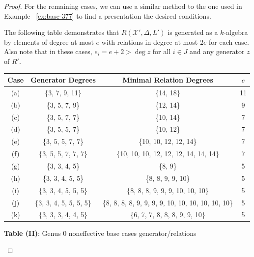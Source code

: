 \documentclass{amsart}
\theoremstyle{plain}
\theoremstyle{definition}
\theoremstyle{remark}
\numberwithin{equation}{section}
\newcommand \sx{\mathscr X}
\begin{document}
\begin{proof}
For the remaining cases, we can use a similar method to the one
used in Example ~\ref{ex:base-377} to find a presentation the
desired conditions.

The following table demonstrates that $R(\sx', \Delta, L')$ is
generated as a $k$-algebra by elements of degree at most $e$
with relations in degree at most $2e$ for each case. Also note
that in these cases, $e_i = e + 2 > \deg z$ for all $i \in J$
and any generator $z$ of $R'$.

\begin{longtable}
	{| c || c | c | c |}
	\hline
	Case & Generator Degrees & Minimal Relation Degrees & $e$\\
	\hline
	\hline

	(a) & \{3, 7, 9, 11\} & \{14, 18\} & 11\\	\hline

	(b) & \{3, 5, 7, 9\} & \{12, 14\}	& 9\\ \hline

	(c) & \{3, 5, 7, 7\} & \{10, 14\}	& 7\\ \hline
	
	(d) & \{3, 5, 5, 7\} & \{10, 12\}	& 7\\ \hline
	
	(e) & \{3, 5, 5, 7, 7\} & \{10, 10, 12, 12, 14\}	& 7\\ \hline
	
	(f) & \{3, 5, 5, 7, 7, 7\} & \{10, 10, 10, 12, 12, 12, 14, 14, 14\}	& 7\\ \hline

	(g) & \{3, 3, 4, 5\} & \{8, 9\} & 5\\ \hline
	
	(h) & \{3, 3, 4, 5, 5\} & \{8, 8, 9, 9, 10\} & 5\\ \hline
	
	(i) & \{3, 3, 4, 5, 5, 5\} &
	\{8, 8, 8, 9, 9, 9, 10, 10, 10\} & 5\\ \hline
	
	(j) & \{3, 3, 4, 5, 5, 5, 5\} &
	\{8, 8, 8, 8, 9, 9, 9, 9, 10, 10, 10, 10, 10, 10\} & 5\\ \hline

	(k) &	\{3, 3, 3, 4,	4, 5\} & \{6, 7, 7, 8, 8, 8, 9, 9, 10\} & 5\\ \hline
\end{longtable}

\begin{center}
\textbf{Table (II)}: Genus 0 noneffective base cases generator/relations
\end{center}


\end{proof}
\end{document}
